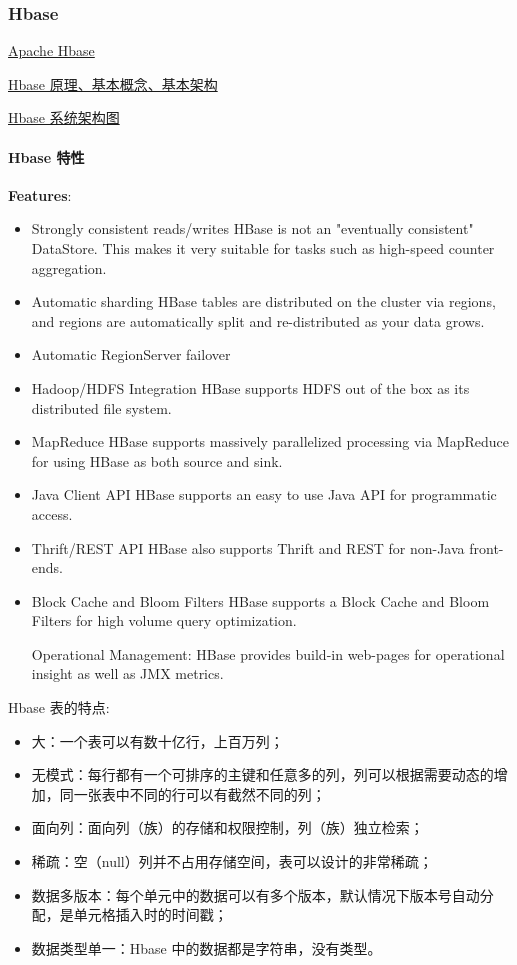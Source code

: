 \documentclass[hyperref, UTF-8]{ctexart}
\begin{document}
\subsubsection{Hbase}
\label{sec:org7026b65}
\href{http://hbase.apache.org}{Apache Hbase}  

\href{http://blog.csdn.net/woshiwanxin102213/article/details/17584043}{Hbase 原理、基本概念、基本架构} 

\href{https://yq.aliyun.com/articles/60452}{Hbase 系统架构图} 
\paragraph{Hbase 特性}
\label{sec:org579e92d}

\textbf{Features}:
\begin{itemize}
\item Strongly consistent reads/writes
HBase is not an "eventually consistent" DataStore. This makes it very suitable for tasks such as high-speed counter aggregation.
\item Automatic sharding
HBase tables are distributed on the cluster via regions, and regions are automatically split and re-distributed as your data grows.
\item Automatic RegionServer failover
\item Hadoop/HDFS Integration
HBase supports HDFS out of the box as its distributed file system.
\item MapReduce
HBase supports massively parallelized processing via MapReduce for using HBase as both source and sink.
\item Java Client API
HBase supports an easy to use Java API for programmatic access.
\item Thrift/REST API
HBase also supports Thrift and REST for non-Java front-ends.
\item Block Cache and Bloom Filters
HBase supports a Block Cache and Bloom Filters for high volume query optimization.  

Operational Management: HBase provides build-in web-pages for operational insight as well as JMX metrics.
\end{itemize}

Hbase 表的特点:
\begin{itemize}
\item 大：一个表可以有数十亿行，上百万列；
\item 无模式：每行都有一个可排序的主键和任意多的列，列可以根据需要动态的增加，同一张表中不同的行可以有截然不同的列；
\item 面向列：面向列（族）的存储和权限控制，列（族）独立检索；
\item 稀疏：空（null）列并不占用存储空间，表可以设计的非常稀疏；
\item 数据多版本：每个单元中的数据可以有多个版本，默认情况下版本号自动分配，是单元格插入时的时间戳；
\item 数据类型单一：Hbase 中的数据都是字符串，没有类型。
\end{itemize}
\end{document}
